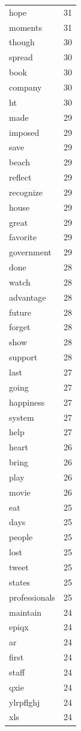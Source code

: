 \begin{tabular}{lr}
hope & 31 \\
moments & 31 \\
though & 30 \\
spread & 30 \\
book & 30 \\
company & 30 \\
ht & 30 \\
made & 29 \\
imposed & 29 \\
save & 29 \\
beach & 29 \\
reflect & 29 \\
recognize & 29 \\
house & 29 \\
great & 29 \\
favorite & 29 \\
government & 29 \\
done & 28 \\
watch & 28 \\
advantage & 28 \\
future & 28 \\
forget & 28 \\
show & 28 \\
support & 28 \\
last & 27 \\
going & 27 \\
happiness & 27 \\
system & 27 \\
help & 27 \\
heart & 26 \\
bring & 26 \\
play & 26 \\
movie & 26 \\
eat & 25 \\
days & 25 \\
people & 25 \\
lost & 25 \\
tweet & 25 \\
states & 25 \\
professionals & 25 \\
maintain & 24 \\
epiqx & 24 \\
ar & 24 \\
first & 24 \\
staff & 24 \\
qxie & 24 \\
ylrpflghj & 24 \\
xls & 24 \\

\end{tabular}
